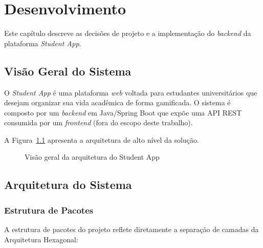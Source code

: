 
\chapter{Desenvolvimento}
\label{cap:desenvolvimento}

Este capítulo descreve as decisões de projeto e a implementação do \textit{backend}
da plataforma \textit{Student App}.

\section{Visão Geral do Sistema}
\label{sec:visao-geral}

O \textit{Student App} é uma plataforma \textit{web} voltada para estudantes
universitários que desejam organizar sua vida acadêmica de forma gamificada. O
sistema é composto por um \textit{backend} em Java/Spring Boot que expõe uma API
REST consumida por um \textit{frontend} (fora do escopo deste trabalho).

A Figura~\ref{fig:visao-geral} apresenta a arquitetura de alto nível da solução.

\begin{figure}[H]
  \centering
  \caption{Visão geral da arquitetura do Student App}
  \label{fig:visao-geral}
\end{figure}

\section{Arquitetura do Sistema}
\label{sec:arquitetura}

\subsection{Estrutura de Pacotes}
\label{subsec:estrutura-pacotes}

A estrutura de pacotes do projeto reflete diretamente a separação de camadas
da Arquitetura Hexagonal:

